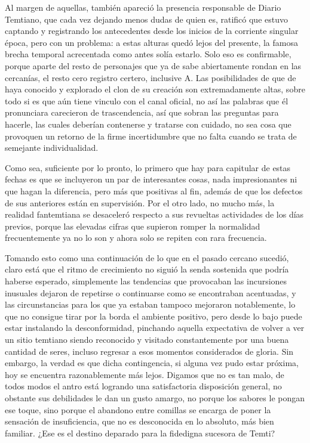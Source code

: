 \documentclass[
]{book}
\begin{document}
Al margen de aquellas, también apareció la presencia responsable de Diario Temtiano, que cada vez dejando menos dudas de quien es, ratificó que estuvo captando y registrando los antecedentes desde los inicios de la corriente singular época, pero con un problema: a estas alturas quedó lejos del presente, la famosa brecha temporal acrecentada como antes solía estarlo. Solo eso es confirmable, porque aparte del resto de personajes que ya de sabe abiertamente rondan en las cercanías, el resto cero registro certero, inclusive A. Las posibilidades de que de haya conocido y explorado el clon de su creación son extremadamente altas, sobre todo si es que aún tiene vinculo con el canal oficial, no así las palabras que él pronunciara carecieron de trascendencia, así que sobran las preguntas para hacerle, las cuales deberían contenerse y tratarse con cuidado, no sea cosa que provoquen un retorno de la firme incertidumbre que no falta cuando se trata de semejante individualidad.

Como sea, suficiente por lo pronto, lo primero que hay para capitular de estas fechas es que se incluyeron un par de interesantes cosas, nada impresionantes ni que hagan la diferencia, pero más que positivas al fin, además de que los defectos de sus anteriores están en supervisión. Por el otro lado, no mucho más, la realidad fantemtiana se desaceleró respecto a sus revueltas actividades de los días previos, porque las elevadas cifras que supieron romper la normalidad frecuentemente ya no lo son y ahora solo se repiten con rara frecuencia.

Tomando esto como una continuación de lo que en el pasado cercano sucedió, claro está que el ritmo de crecimiento no siguió la senda sostenida que podría haberse esperado, simplemente las tendencias que provocaban las incursiones inusuales dejaron de repetirse o continuarse como se encontraban acentuadas, y las circunstancias para los que ya estaban tampoco mejoraron notablemente, lo que no consigue tirar por la borda el ambiente positivo, pero desde lo bajo puede estar instalando la desconformidad, pinchando aquella expectativa de volver a ver un sitio temtiano siendo reconocido y visitado constantemente por una buena cantidad de seres, incluso regresar a esos momentos considerados de gloria. Sin embargo, la verdad es que dicha contingencia, si alguna vez pudo estar próxima, hoy se encuentra razonablemente más lejos. Digamos que no es tan malo, de todos modos el antro está logrando una satisfactoria disposición general, no obstante sus debilidades le dan un gusto amargo, no porque los sabores le pongan ese toque, sino porque el abandono entre comillas se encarga de poner la sensación de insuficiencia, que no es desconocida en lo absoluto, más bien familiar. ¿Ese es el destino deparado para la fidedigna sucesora de Temti?
\end{document}
